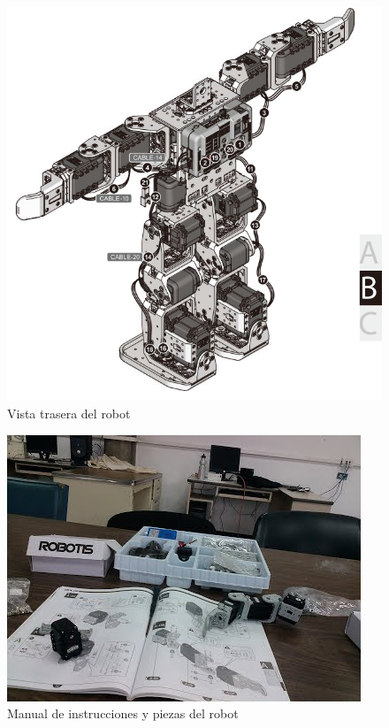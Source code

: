 \begin{figure}[hbtp]
\centering
\includegraphics[scale=0.4]{imagenes/RobotTrasero.png}
\caption{Vista trasera del robot}
\end{figure}

\begin{figure}[hbtp]
\centering
\includegraphics[scale=0.7]{imagenes/CIMG0225.jpg}
\caption{Manual de instrucciones y piezas del robot}
\end{figure}



